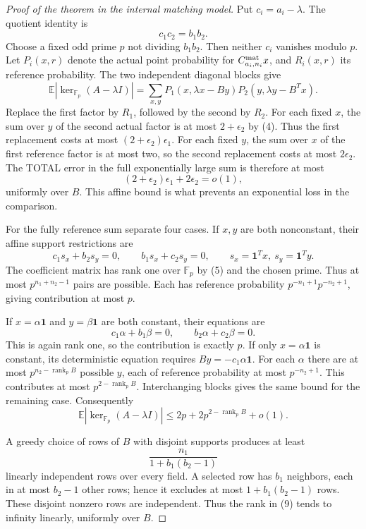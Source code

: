 \documentclass[11pt]{article}
\newcommand{\F}{\mathbb F}
\newcommand{\E}{\mathbb E}
\newcommand{\one}{\mathbf1}
\begin{document}
\begin{proof}[Proof of the theorem in the internal matching model]
Put $c_i=a_i-\lambda$. The quotient identity is
\[
 c_1c_2=b_1b_2.                                          \tag{5}
\]
Choose a fixed odd prime $p$ not dividing $b_1b_2$. Then neither $c_i$
vanishes modulo $p$. Let $P_i(x,r)$ denote the actual point probability
for $C^{\rm mat}_{a_i,n_i}x$, and $R_i(x,r)$ its reference probability.
The two independent diagonal blocks give
\[
 \E|\ker_{\F_p}(A-\lambda I)|
 =\sum_{x,y}P_1(x,\lambda x-By)P_2(y,\lambda y-B^Tx).
 \tag{6}
\]
Replace the first factor by $R_1$, followed by the second by $R_2$.
For each fixed $x$, the sum over $y$ of the second actual factor is at
most $2+\epsilon_2$ by (4). Thus the first replacement costs at most
$(2+\epsilon_2)\epsilon_1$. For each fixed $y$, the sum over $x$ of the
first reference factor is at most two, so the second replacement costs
at most $2\epsilon_2$. The TOTAL error in the full exponentially large
sum is therefore at most
\[
 (2+\epsilon_2)\epsilon_1+2\epsilon_2=o(1),                \tag{7}
\]
uniformly over $B$. This affine bound is what prevents an exponential
loss in the comparison.

For the fully reference sum separate four cases. If $x,y$ are both
nonconstant, their affine support restrictions are
\[
 c_1s_x+b_2s_y=0,\qquad b_1s_x+c_2s_y=0,
 \qquad s_x=\one^Tx,\ s_y=\one^Ty.                        \tag{8}
\]
The coefficient matrix has rank one over $\F_p$ by (5) and the chosen
prime. Thus at most $p^{n_1+n_2-1}$ pairs are possible. Each has
reference probability $p^{-n_1+1}p^{-n_2+1}$, giving contribution at
most $p$.

If $x=\alpha\one$ and $y=\beta\one$ are both constant, their equations
are
\[
 c_1\alpha+b_1\beta=0,\qquad b_2\alpha+c_2\beta=0.
\]
This is again rank one, so the contribution is exactly $p$.
If only $x=\alpha\one$ is constant, its deterministic equation requires
$By=-c_1\alpha\one$. For each $\alpha$ there are at most
$p^{n_2-\operatorname{rank}_p B}$ possible $y$, each of reference
probability at most $p^{-n_2+1}$. This contributes at most
$p^{2-\operatorname{rank}_p B}$. Interchanging blocks gives the same
bound for the remaining case. Consequently
\[
 \E|\ker_{\F_p}(A-\lambda I)|
 \leq2p+2p^{2-\operatorname{rank}_p B}+o(1).                \tag{9}
\]

A greedy choice of rows of $B$ with disjoint supports produces at least
\[
 \frac{n_1}{1+b_1(b_2-1)}
\]
linearly independent rows over every field. A selected row has $b_1$
neighbors, each in at most $b_2-1$ other rows; hence it excludes at most
$1+b_1(b_2-1)$ rows. These disjoint nonzero rows are independent.
Thus the rank in (9) tends to infinity linearly, uniformly over $B$.


\end{proof}
\end{document}
